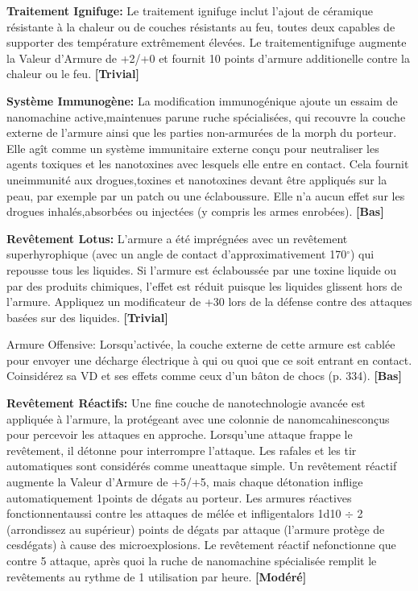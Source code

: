 \textbf{Traitement Ignifuge:} Le traitement ignifuge inclut l'ajout de céramique résistante à la chaleur ou de couches résistants au feu, toutes deux capables de supporter des température extrêmement élevées. Le traitementignifuge augmente la Valeur d'Armure de +2/+0 et fournit 10 points d'armure additionelle contre la chaleur ou le feu. \textbf{[Trivial]} 

\textbf{Système Immunogène:} La modification immunogénique ajoute un essaim de nanomachine active,maintenues parune ruche spécialisées, qui recouvre la couche externe de l'armure ainsi que les parties non-armurées de la morph du porteur. Elle agît comme un système immunitaire externe conçu pour neutraliser les agents toxiques et les nanotoxines avec lesquels elle entre en contact. Cela fournit uneimmunité aux drogues,toxines et nanotoxines devant être appliqués sur la peau, par exemple par un patch ou une éclaboussure. Elle n'a aucun effet sur les drogues inhalés,absorbées ou injectées (y compris les armes enrobées). \textbf{[Bas]} 

\textbf{Revêtement Lotus:} L'armure a été imprégnées avec un revêtement superhyrophique (avec un angle de contact d'approximativement 170$^{\circ}$) qui repousse tous les liquides. Si l'armure est éclaboussée par une toxine liquide ou par des produits chimiques, l'effet est réduit puisque les liquides glissent hors de l'armure. Appliquez un modificateur de +30 lors de la défense contre des attaques basées sur des liquides. \textbf{[Trivial]} 

Armure Offensive: Lorsqu'activée, la couche externe de cette armure est cablée pour envoyer une décharge électrique à qui ou quoi que ce soit entrant en contact. Coinsidérez sa VD et ses effets comme ceux d'un bâton de chocs (p. 334). \textbf{[Bas]} 

\textbf{Revêtement Réactifs:} Une fine couche de nanotechnologie avancée est appliquée à l'armure, la protégeant avec une colonnie de nanomcahinesconçus pour percevoir les attaques en approche. Lorsqu'une attaque frappe le revêtement, il détonne pour interrompre l'attaque. Les rafales et les tir automatiques sont considérés comme uneattaque simple. Un revêtement réactif augmente la Valeur d'Armure de +5/+5, mais chaque détonation inflige automatiquement 1points de dégats au porteur. Les armures réactives fonctionnentaussi contre les attaques de mélée et infligentalors 1d10 $\div$ 2 (arrondissez au supérieur) points de dégats par attaque (l'armure protège de cesdégats) à cause des microexplosions. Le revêtement réactif nefonctionne que contre 5 attaque, après quoi la ruche de nanomachine spécialisée remplit le revêtements au rythme de 1 utilisation par heure. \textbf{[Modéré]} 

